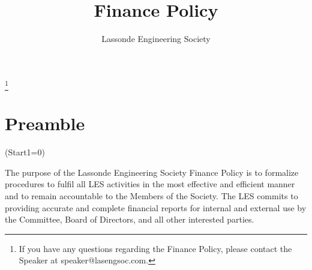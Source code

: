 \documentclass[10pt]{article}
\title{Finance Policy}
\author{Lassonde Engineering Society}
\date{}
\begin{document}
\pagebreak

\tableofcontents\let\thefootnote\relax\footnote{{If you have any questions regarding the Finance Policy, please contact the Speaker at speaker@lasengsoc.com.}}
\clearpage

\setcounter{page}{1}

\section{Preamble}
\vspace{5mm} %
\ListProperties(Start1=0)
\begin{easylist}
The purpose of the Lassonde Engineering Society Finance Policy is to formalize procedures to fulfil all LES activities in the most effective and efficient manner and to remain accountable to the Members of the Society. The LES commits to providing accurate and complete financial reports for internal and external use by the Committee, Board of Directors, and all other interested parties.
\end{easylist}
\end{document}
